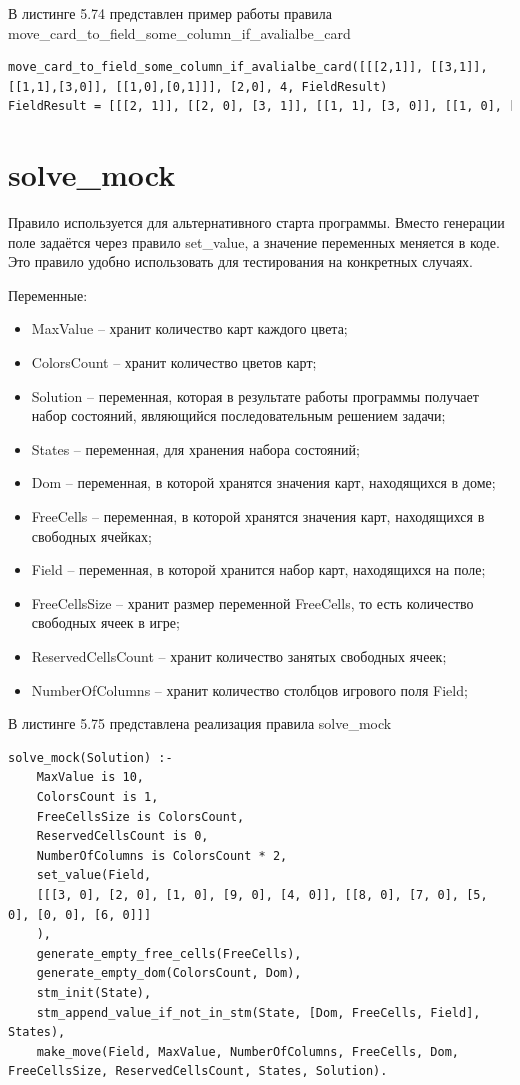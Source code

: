 \documentclass[12pt]{report}
\begin{document}
В листинге 5.74 представлен пример работы правила move\_card\_to\_field\_some\_column\_if\_avalialbe\_card

\begin{lstlisting}[label=some-code, caption=реализация правила \newline move\_card\_to\_field\_some\_column\_if\_avalialbe\_card] 
move_card_to_field_some_column_if_avalialbe_card([[[2,1]], [[3,1]], [[1,1],[3,0]], [[1,0],[0,1]]], [2,0], 4, FieldResult)
FieldResult = [[[2, 1]], [[2, 0], [3, 1]], [[1, 1], [3, 0]], [[1, 0], [0, 1]]]
\end{lstlisting}
\section{solve\_mock}
Правило используется для альтернативного старта программы. Вместо генерации поле задаётся через правило set\_value, а значение переменных меняется в коде. Это правило удобно использовать для тестирования на конкретных случаях.

Переменные:
\begin{itemize}
\item MaxValue – хранит количество карт каждого цвета;
\item ColorsCount – хранит количество цветов карт;
\item Solution – переменная, которая в результате работы программы получает набор состояний, являющийся последовательным решением задачи;
\item States – переменная, для хранения набора состояний;
\item Dom – переменная, в которой хранятся значения карт, находящихся в доме;
\item FreeCells – переменная, в которой хранятся значения карт, находящихся в свободных ячейках;
\item Field – переменная, в которой хранится набор карт, находящихся на поле;
\item FreeCellsSize – хранит размер переменной FreeCells, то есть количество свободных ячеек в игре;
\item ReservedCellsCount – хранит количество занятых свободных ячеек;
\item NumberOfColumns – хранит количество столбцов игрового поля Field;
\end{itemize}

В листинге 5.75 представлена реализация правила solve\_mock

\begin{lstlisting}[label=some-code, caption=реализация правила solve\_mock]
solve_mock(Solution) :-
	MaxValue is 10,
	ColorsCount is 1,
	FreeCellsSize is ColorsCount,
	ReservedCellsCount is 0,
	NumberOfColumns is ColorsCount * 2,
	set_value(Field,
	[[[3, 0], [2, 0], [1, 0], [9, 0], [4, 0]], [[8, 0], [7, 0], [5, 0], [0, 0], [6, 0]]]
	),
	generate_empty_free_cells(FreeCells),
	generate_empty_dom(ColorsCount, Dom),
	stm_init(State),
	stm_append_value_if_not_in_stm(State, [Dom, FreeCells, Field], States),
	make_move(Field, MaxValue, NumberOfColumns, FreeCells, Dom, FreeCellsSize, ReservedCellsCount, States, Solution).

\end{lstlisting}
\end{document}
